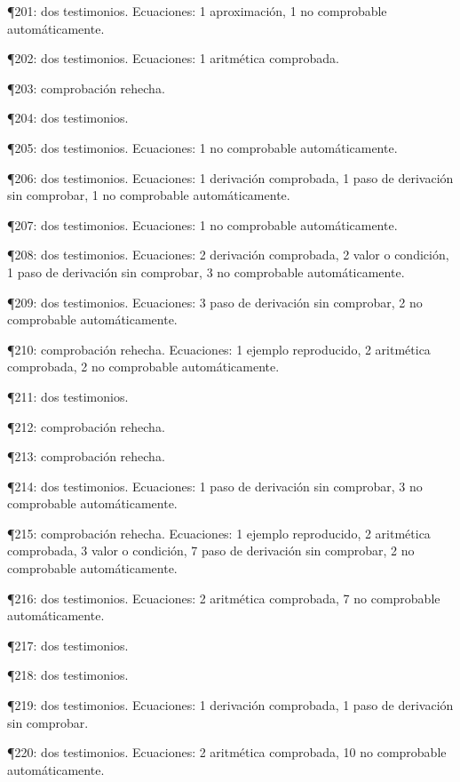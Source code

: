 \documentclass[10pt,openany]{book}
\begin{document}
\noindent ¶201: dos testimonios. Ecuaciones: 1 aproximación, 1 no comprobable automáticamente.\par
\noindent ¶202: dos testimonios. Ecuaciones: 1 aritmética comprobada.\par
\noindent ¶203: comprobación rehecha.\par
\noindent ¶204: dos testimonios.\par
\noindent ¶205: dos testimonios. Ecuaciones: 1 no comprobable automáticamente.\par
\noindent ¶206: dos testimonios. Ecuaciones: 1 derivación comprobada, 1 paso de derivación sin comprobar, 1 no comprobable automáticamente.\par
\noindent ¶207: dos testimonios. Ecuaciones: 1 no comprobable automáticamente.\par
\noindent ¶208: dos testimonios. Ecuaciones: 2 derivación comprobada, 2 valor o condición, 1 paso de derivación sin comprobar, 3 no comprobable automáticamente.\par
\noindent ¶209: dos testimonios. Ecuaciones: 3 paso de derivación sin comprobar, 2 no comprobable automáticamente.\par
\noindent ¶210: comprobación rehecha. Ecuaciones: 1 ejemplo reproducido, 2 aritmética comprobada, 2 no comprobable automáticamente.\par
\noindent ¶211: dos testimonios.\par
\noindent ¶212: comprobación rehecha.\par
\noindent ¶213: comprobación rehecha.\par
\noindent ¶214: dos testimonios. Ecuaciones: 1 paso de derivación sin comprobar, 3 no comprobable automáticamente.\par
\noindent ¶215: comprobación rehecha. Ecuaciones: 1 ejemplo reproducido, 2 aritmética comprobada, 3 valor o condición, 7 paso de derivación sin comprobar, 2 no comprobable automáticamente.\par
\noindent ¶216: dos testimonios. Ecuaciones: 2 aritmética comprobada, 7 no comprobable automáticamente.\par
\noindent ¶217: dos testimonios.\par
\noindent ¶218: dos testimonios.\par
\noindent ¶219: dos testimonios. Ecuaciones: 1 derivación comprobada, 1 paso de derivación sin comprobar.\par
\noindent ¶220: dos testimonios. Ecuaciones: 2 aritmética comprobada, 10 no comprobable automáticamente.\par
\end{document}
